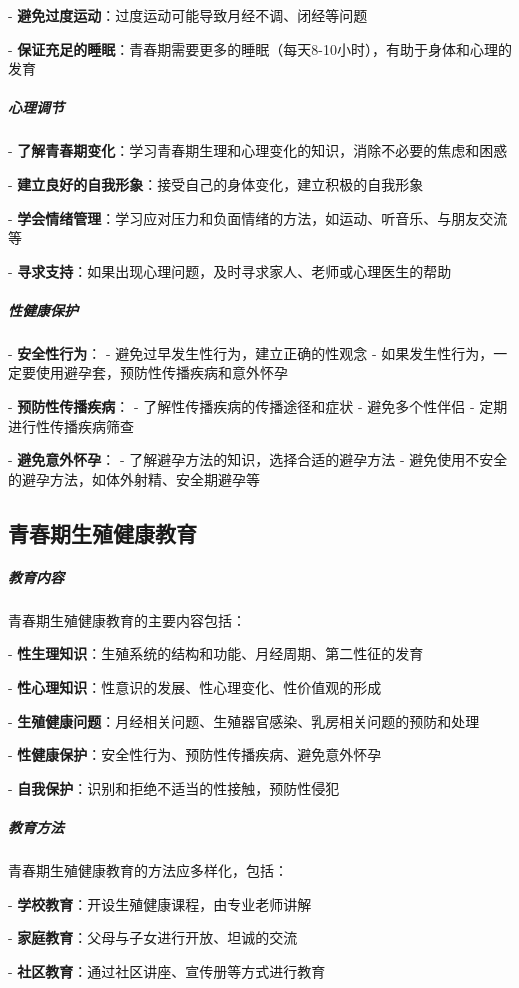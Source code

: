 \begin{enumerate}
- \textbf{避免过度运动}：过度运动可能导致月经不调、闭经等问题

- \textbf{保证充足的睡眠}：青春期需要更多的睡眠（每天8-10小时），有助于身体和心理的发育

\subparagraph{心理调节}

- \textbf{了解青春期变化}：学习青春期生理和心理变化的知识，消除不必要的焦虑和困惑

- \textbf{建立良好的自我形象}：接受自己的身体变化，建立积极的自我形象

- \textbf{学会情绪管理}：学习应对压力和负面情绪的方法，如运动、听音乐、与朋友交流等

- \textbf{寻求支持}：如果出现心理问题，及时寻求家人、老师或心理医生的帮助

\subparagraph{性健康保护}

- \textbf{安全性行为}：
  - 避免过早发生性行为，建立正确的性观念
  - 如果发生性行为，一定要使用避孕套，预防性传播疾病和意外怀孕

- \textbf{预防性传播疾病}：
  - 了解性传播疾病的传播途径和症状
  - 避免多个性伴侣
  - 定期进行性传播疾病筛查

- \textbf{避免意外怀孕}：
  - 了解避孕方法的知识，选择合适的避孕方法
  - 避免使用不安全的避孕方法，如体外射精、安全期避孕等

\subsection{青春期生殖健康教育}

\subparagraph{教育内容}

青春期生殖健康教育的主要内容包括：

- \textbf{性生理知识}：生殖系统的结构和功能、月经周期、第二性征的发育

- \textbf{性心理知识}：性意识的发展、性心理变化、性价值观的形成

- \textbf{生殖健康问题}：月经相关问题、生殖器官感染、乳房相关问题的预防和处理

- \textbf{性健康保护}：安全性行为、预防性传播疾病、避免意外怀孕

- \textbf{自我保护}：识别和拒绝不适当的性接触，预防性侵犯

\subparagraph{教育方法}

青春期生殖健康教育的方法应多样化，包括：

- \textbf{学校教育}：开设生殖健康课程，由专业老师讲解

- \textbf{家庭教育}：父母与子女进行开放、坦诚的交流

- \textbf{社区教育}：通过社区讲座、宣传册等方式进行教育


\end{enumerate}
